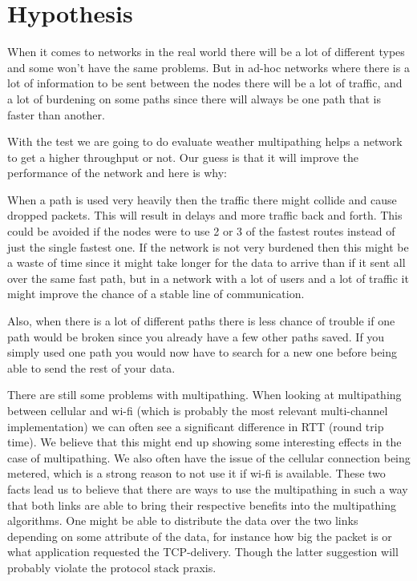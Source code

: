 \documentclass[11pt,twocolumn]{article}
\begin{document}
\section{Hypothesis}

When it comes to networks in the real world there will be a lot of different types and some won't have the same problems. But in ad-hoc networks where there is a lot of information to be sent between the nodes there will be a lot of traffic, and a lot of burdening on some paths since there will always be one path that is faster than another.

With the test we are going to do evaluate weather multipathing helps a network to get a higher throughput or not. Our guess is that it will improve the performance of the network and here is why:

When a path is used very heavily then the traffic there might collide and cause dropped packets. This will result in delays and more traffic back and forth. This could be avoided if the nodes were to use 2 or 3 of the fastest routes instead of just the single fastest one. If the network is not very burdened then this might be a waste of time since it might take longer for the data to arrive than if it sent all over the same fast path, but in a network with a lot of users and a lot of traffic it might improve the chance of a stable line of communication.

Also, when there is a lot of different paths there is less chance of trouble if one path would be broken since you already have a few other paths saved. If you simply used one path you would now have to search for a new one before being able to send the rest of your data.

There are still some problems with multipathing. When looking at multipathing between cellular and wi-fi (which is probably the most relevant multi-channel implementation) we can often see a significant difference in RTT (round trip time). We believe that this might end up showing some interesting effects in the case of multipathing. We also often have the issue of the cellular connection being metered, which is a strong reason to not use it if wi-fi is available. These two facts lead us to believe that there are ways to use the multipathing in such a way that both links are able to bring their respective benefits into the multipathing algorithms. One might be able to distribute the data over the two links depending on some attribute of the data, for instance how big the packet is or what application requested the TCP-delivery. Though the latter suggestion will probably violate the protocol stack praxis.
\end{document}

